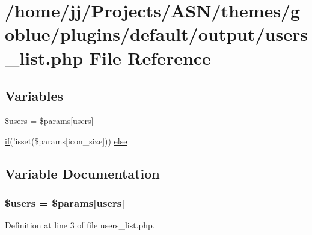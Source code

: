 \hypertarget{themes_2goblue_2plugins_2default_2output_2users__list_8php}{}\section{/home/jj/\+Projects/\+A\+S\+N/themes/goblue/plugins/default/output/users\+\_\+list.php File Reference}
\label{themes_2goblue_2plugins_2default_2output_2users__list_8php}
\subsection*{Variables}
\begin{DoxyCompactItemize}
\item 
\hyperlink{themes_2goblue_2plugins_2default_2output_2users__list_8php_a28005d22fa7ef2dfe215ad886b497d9c}{\$users} = \$params\mbox{[}\textquotesingle{}users\textquotesingle{}\mbox{]}
\item 
\hyperlink{jquery_8tokeninput_8js_ad8dd46a3cbc004569e34401e9e71771a}{if}(!isset(\$params\mbox{[}\textquotesingle{}icon\+\_\+size\textquotesingle{}\mbox{]})) \hyperlink{themes_2goblue_2plugins_2default_2output_2users__list_8php_a84bc790677077b8d19ffccf3db9f832c}{else}
\end{DoxyCompactItemize}


\subsection{Variable Documentation}
\subsubsection[{\texorpdfstring{\$users}{$users}}]{\setlength{\rightskip}{0pt plus 5cm}\$users = \$params\mbox{[}\textquotesingle{}users\textquotesingle{}\mbox{]}}\hypertarget{themes_2goblue_2plugins_2default_2output_2users__list_8php_a28005d22fa7ef2dfe215ad886b497d9c}{}\label{themes_2goblue_2plugins_2default_2output_2users__list_8php_a28005d22fa7ef2dfe215ad886b497d9c}


Definition at line 3 of file users\+\_\+list.\+php.


